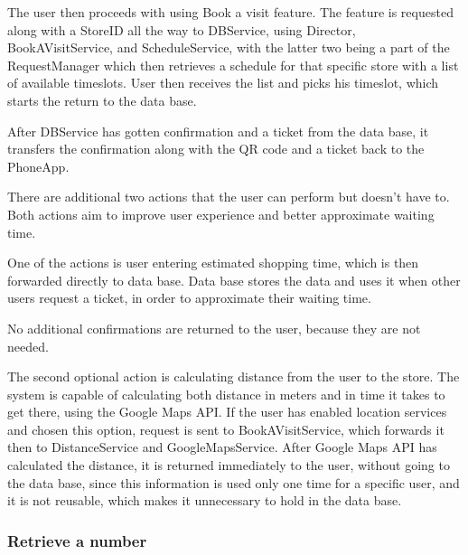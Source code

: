   

The user then proceeds with using Book a visit feature. The feature is requested along with a StoreID all the way to DBService, using Director, BookAVisitService, and ScheduleService, with the latter two being a part of the RequestManager which then retrieves a schedule for that specific store with a list of available timeslots. User then receives the list and picks his timeslot, which starts the return to the data base.  

  
After DBService has gotten confirmation and a ticket from the data base, it transfers the confirmation along with the QR code and a ticket back to the PhoneApp.  
  
There are additional two actions that the user can perform but doesn't have to. Both actions aim to improve user experience and better approximate waiting time.  

  

One of the actions is user entering estimated shopping time, which is then forwarded directly to data base. Data base stores the data and uses it when other users request a ticket, in order to approximate their waiting time.  

No additional confirmations are returned to the user, because they are not needed.  

  

The second optional action is calculating distance from the user to the store. The system is capable of calculating both distance in meters and in time it takes to get there, using the Google Maps API. If the user has enabled location services and chosen this option, request is sent to BookAVisitService, which forwards it then to DistanceService and GoogleMapsService. After Google Maps API has calculated the distance, it is returned immediately to the user, without going to the data base, since this information is used only one time for a specific user, and it is not reusable, which makes it unnecessary to hold in the data base.  
\newpage

\subsubsection{Retrieve a number }


